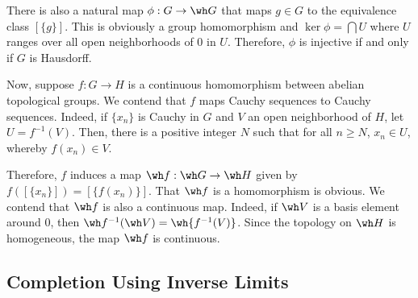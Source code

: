 There is also a natural map $\phi: G\to\wh G$ that maps $g\in G$ to the equivalence class $[\{g\}]$. This is obviously a group homomorphism and $\ker\phi = \bigcap U$ where $U$ ranges over all open neighborhoods of $0$ in $U$. Therefore, $\phi$ is injective if and only if $G$ is Hausdorff.

Now, suppose $f: G\to H$ is a continuous homomorphism between abelian topological groups. We contend that $f$ maps Cauchy sequences to Cauchy sequences. Indeed, if $\{x_n\}$ is Cauchy in $G$ and $V$ an open neighborhood of $H$, let $U = f^{-1}(V)$. Then, there is a positive integer $N$ such that for all $n\ge N$, $x_n\in U$, whereby $f(x_n)\in V$.

Therefore, $f$ induces a map $\wh f: \wh G\to\wh H$ given by $f([\{x_n\}]) = [\{f(x_n)\}]$. That $\wh f$ is a homomorphism is obvious. We contend that $\wh f$ is also a continuous map. Indeed, if $\wh V$ is a basis element around $0$, then $\wh f^{-1}(\wh V) = \wh{f^{-1}(V)}$. Since the topology on $\wh H$ is homogeneous, the map $\wh f$ is continuous.

\subsection{Completion Using Inverse Limits}
